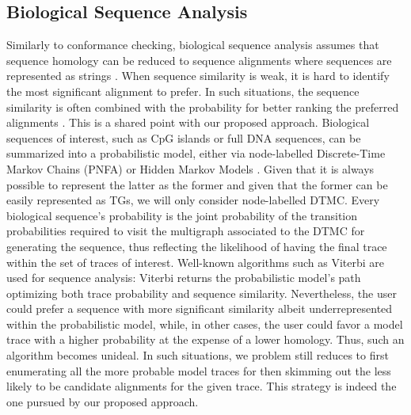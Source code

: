 

\subsection{Biological Sequence Analysis}
Similarly to conformance checking, biological sequence analysis assumes that sequence homology can be reduced to sequence alignments where sequences are represented as strings \cite{durbin1998biological}. When sequence similarity is weak, it is hard to identify the most significant alignment to prefer. In such situations, the sequence similarity is often combined with the probability for better ranking the preferred alignments \cite{durbin1998biological}. This is a shared point with our proposed approach. 
%
Biological sequences of interest, such as CpG islands or full DNA sequences, can be summarized into a probabilistic model, either via node-labelled Discrete-Time Markov Chains (PNFA) \cite{RyabkoU08} or Hidden Markov Models \cite{Helske2018}. Given that it is always possible to represent the latter as the former \cite{DUPONT20051349} and given that the former can be easily represented as TGs, we will only consider node-labelled DTMC. %
Every biological sequence's probability is the joint probability of the transition probabilities required to visit the multigraph associated to the DTMC for generating the sequence, thus %
reflecting the likelihood of having the final trace within the set of traces of interest. 
%
Well-known algorithms such as Viterbi are used for sequence analysis: Viterbi returns
the probabilistic model's path optimizing both trace probability and sequence similarity.  Nevertheless, the user could prefer a sequence with more significant similarity albeit underrepresented within the probabilistic model, while, in other cases, the user could favor a model trace with a higher probability at the expense of a lower homology. Thus, such an algorithm becomes unideal. In such situations, we problem still reduces to first enumerating all the more probable model traces for then skimming out the less likely to be candidate alignments for the given trace. This strategy is indeed the one pursued by our proposed approach. 
